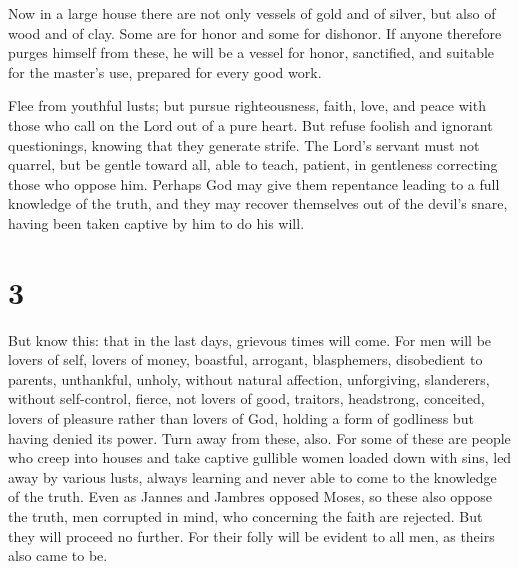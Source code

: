  Now in a large house there are not only vessels of gold
and of silver, but also of wood and of clay. Some are for honor and some
for dishonor.  If anyone therefore purges himself from
these, he will be a vessel for honor, sanctified, and suitable for the
master's use, prepared for every good work.

 Flee from youthful lusts; but pursue righteousness,
faith, love, and peace with those who call on the Lord out of a pure
heart.  But refuse foolish and ignorant questionings,
knowing that they generate strife.  The Lord's servant
must not quarrel, but be gentle toward all, able to teach, patient,
 in gentleness correcting those who oppose him. Perhaps
God may give them repentance leading to a full knowledge of the truth,
 and they may recover themselves out of the devil's
snare, having been taken captive by him to do his will.

\hypertarget{section-2}{%
\section{3}\label{section-2}}

 But know this: that in the last days, grievous times will
come.  For men will be lovers of self, lovers of money,
boastful, arrogant, blasphemers, disobedient to parents, unthankful,
unholy,  without natural affection, unforgiving,
slanderers, without self-control, fierce, not lovers of good,
 traitors, headstrong, conceited, lovers of pleasure
rather than lovers of God,  holding a form of godliness
but having denied its power. Turn away from these, also. 
For some of these are people who creep into houses and take captive
gullible women loaded down with sins, led away by various lusts,
 always learning and never able to come to the knowledge
of the truth.  Even as Jannes and Jambres opposed Moses,
so these also oppose the truth, men corrupted in mind, who concerning
the faith are rejected.  But they will proceed no further.
For their folly will be evident to all men, as theirs also came to be.

